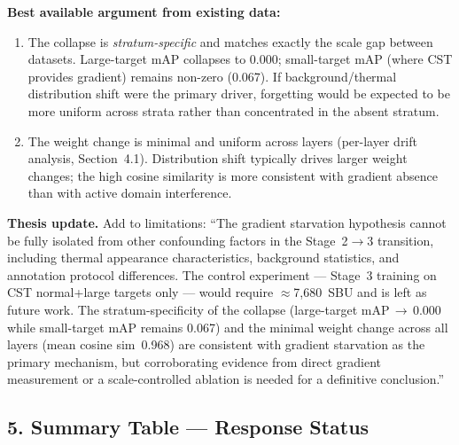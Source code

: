 \vspace{0.5em}
\noindent\textbf{Best available argument from existing data:}
\begin{enumerate}
    \item The collapse is \textit{stratum-specific} and matches exactly the
    scale gap between datasets. Large-target mAP collapses to 0.000; small-target
    mAP (where CST provides gradient) remains non-zero (0.067). If background/thermal
    distribution shift were the primary driver, forgetting would be expected to be
    more uniform across strata rather than concentrated in the absent stratum.
    \item The weight change is minimal and uniform across layers (per-layer drift
    analysis, Section~4.1). Distribution shift typically drives larger weight
    changes; the high cosine similarity is more consistent with gradient absence
    than with active domain interference.
\end{enumerate}

\noindent\textbf{Thesis update.} Add to limitations: ``The gradient starvation
hypothesis cannot be fully isolated from other confounding factors in the
Stage~2$\to$3 transition, including thermal appearance characteristics,
background statistics, and annotation protocol differences. The control
experiment --- Stage~3 training on CST normal+large targets only --- would
require $\approx$7,680~SBU and is left as future work. The stratum-specificity
of the collapse (large-target mAP\,$\to$\,0.000 while small-target mAP remains
0.067) and the minimal weight change across all layers (mean cosine sim~0.968)
are consistent with gradient starvation as the primary mechanism, but
corroborating evidence from direct gradient measurement or a scale-controlled
ablation is needed for a definitive conclusion.''

\subsection*{5. Summary Table --- Response Status}

